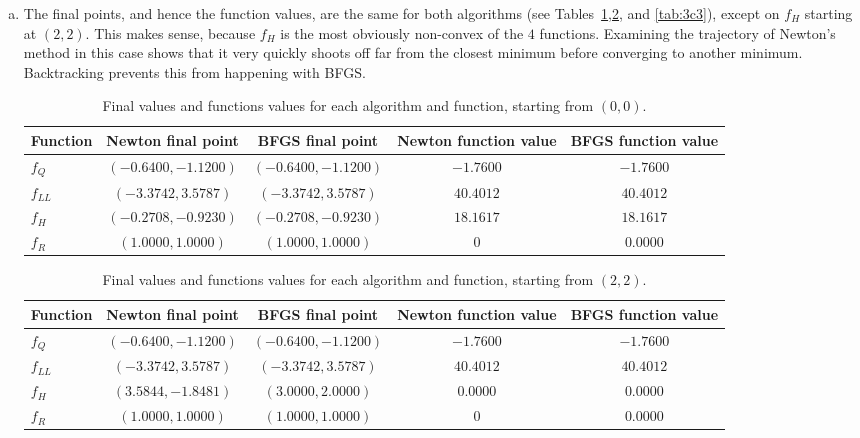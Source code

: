 \documentclass[11pt]{article}
\begin{document}
\begin{enumerate}[(a)]
\item The final points, and hence the function values, are the same for both
algorithms (see Tables~\ref{tab:3c1},\ref{tab:3c2}, and \ref{tab:3c3}), except
on $f_H$ starting at $(2,2)$. This makes sense, because $f_H$ is the most
obviously non-convex of the $4$ functions. Examining the trajectory of Newton's
method in this case shows that it very quickly shoots off far from the closest
minimum before converging to another minimum. Backtracking prevents this from
happening with BFGS.
\begin{table}
\centering
\begin{tabular}[h]{lcccc}
Function  & Newton final point    & BFGS final point        & Newton function value & BFGS function value   \\
\hline
$f_Q$     & $(-0.6400,  -1.1200)$ & $(-0.6400,   -1.1200)$  & $   -1.7600$          & $ -1.7600$            \\
$f_{LL}$  & $(-3.3742,   3.5787)$ & $(-3.3742,    3.5787)$  & $   40.4012$          & $ 40.4012$            \\
$f_H$     & $(-0.2708,  -0.9230)$ & $(-0.2708,   -0.9230)$  & $   18.1617$          & $ 18.1617$            \\
$f_R$     & $( 1.0000,   1.0000)$ & $( 1.0000,    1.0000)$  & $         0$          & $  0.0000$
\end{tabular}
\caption{Final values and functions values for each algorithm and
function, starting from $(0,0)$.}
\label{tab:3c1}
\end{table}

\begin{table}
\centering
\begin{tabular}[h]{lcccc}
Function  & Newton final point    & BFGS final point        & Newton function value & BFGS function value   \\
\hline
$f_Q$     & $(-0.6400,  -1.1200)$ & $(-0.6400,   -1.1200)$  & $   -1.7600$          & $ -1.7600$            \\
$f_{LL}$  & $(-3.3742,   3.5787)$ & $(-3.3742,    3.5787)$  & $   40.4012$          & $ 40.4012$            \\
$f_H$     & $( 3.5844,  -1.8481)$ & $( 3.0000,    2.0000)$  & $    0.0000$          & $  0.0000$            \\
$f_R$     & $( 1.0000,   1.0000)$ & $( 1.0000,    1.0000)$  & $         0$          & $  0.0000$
\end{tabular}
\caption{Final values and functions values for each algorithm and
function, starting from $(2,2)$.}
\label{tab:3c2}
\end{table}


\end{enumerate}
\end{document}
